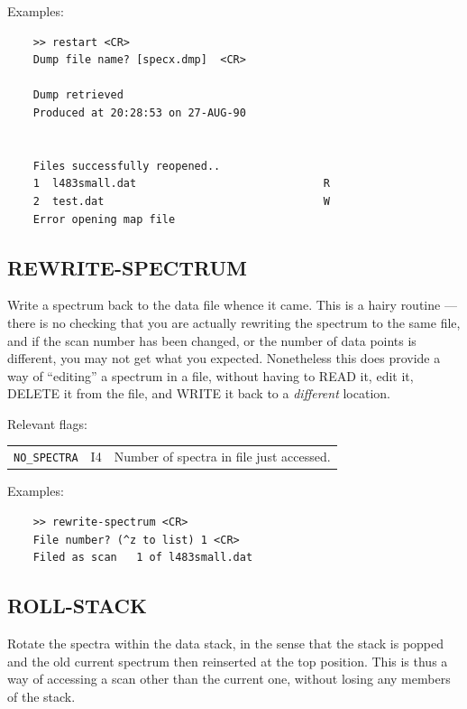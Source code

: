 \documentclass[11pt,twoside]{report}
\begin{document}
Examples:
\begin{verbatim}
    >> restart <CR>
    Dump file name? [specx.dmp]  <CR>

    Dump retrieved
    Produced at 20:28:53 on 27-AUG-90


    Files successfully reopened..
    1  l483small.dat                             R
    2  test.dat                                  W
    Error opening map file

\end{verbatim}

\subsection{REWRITE-SPECTRUM} 

Write a spectrum back to the data file whence it came. This is a hairy
routine --- there is no checking that you are actually rewriting the spectrum
to the same file, and if the scan number has been changed, or the number of
data points is different, you may not get what you expected. Nonetheless this
does provide a way of ``editing'' a spectrum in a file, without having to
READ it, edit it, DELETE it from the file, and WRITE it back to a {\em
different} location.

Relevant flags:\\
\begin{tabular}{lll}
  \verb+NO_SPECTRA+  & I4 & Number of spectra in file just accessed.
\end{tabular}

Examples:
\begin{verbatim}
    >> rewrite-spectrum <CR>
    File number? (^z to list) 1 <CR>
    Filed as scan   1 of l483small.dat

\end{verbatim}

\subsection{ROLL-STACK} 

Rotate the spectra within the data stack, in the sense that the stack is
popped and the old current spectrum then reinserted at the top position.
This is thus a way of accessing a scan other than the current one, without
losing any members of the stack.
\end{document}
